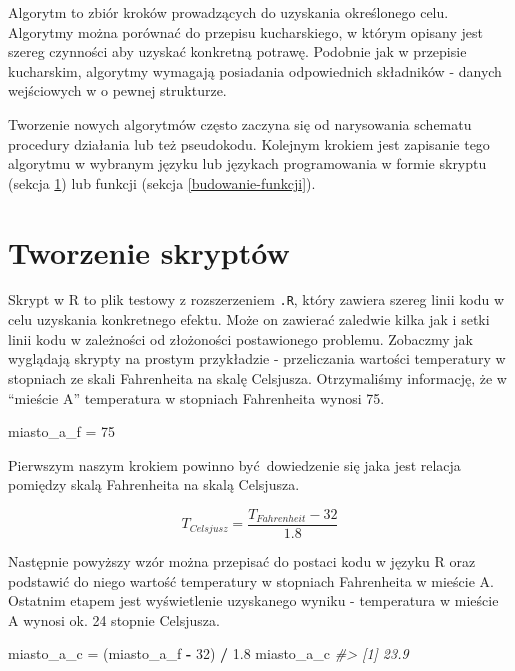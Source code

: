 \documentclass[paper=6in:9in,pagesize=pdftex,headinclude=on,footinclude=on,10pt]{scrbook}
\newenvironment{Shaded}{\begin{snugshade}}{\end{snugshade}}
\newcommand{\CommentTok}[1]{\textcolor[rgb]{0.56,0.35,0.01}{\textit{#1}}}
\newcommand{\DecValTok}[1]{\textcolor[rgb]{0.00,0.00,0.81}{#1}}
\newcommand{\FloatTok}[1]{\textcolor[rgb]{0.00,0.00,0.81}{#1}}
\newcommand{\NormalTok}[1]{#1}
\newcommand{\OperatorTok}[1]{\textcolor[rgb]{0.81,0.36,0.00}{\textbf{#1}}}
\newcommand{\StringTok}[1]{\textcolor[rgb]{0.31,0.60,0.02}{#1}}
\begin{document}
Algorytm to zbiór kroków prowadzących do uzyskania określonego celu.
Algorytmy można porównać do przepisu kucharskiego, w którym opisany jest szereg czynności aby uzyskać konkretną potrawę.
Podobnie jak w przepisie kucharskim, algorytmy wymagają posiadania odpowiednich składników - danych wejściowych w o pewnej strukturze.

Tworzenie nowych algorytmów często zaczyna się od narysowania schematu procedury działania lub też pseudokodu.
Kolejnym krokiem jest zapisanie tego algorytmu w wybranym języku lub językach programowania w formie skryptu (sekcja \ref{tworzenie-skryptow}) lub funkcji (sekcja \ref{budowanie-funkcji}).

\hypertarget{tworzenie-skryptow}{%
\section{Tworzenie skryptów}\label{tworzenie-skryptow}}

Skrypt w R to plik testowy z rozszerzeniem \texttt{.R}, który zawiera szereg linii kodu w celu uzyskania konkretnego efektu.
Może on zawierać zaledwie kilka jak i setki linii kodu w zależności od złożoności postawionego problemu.
Zobaczmy jak wyglądają skrypty na prostym przykładzie - przeliczania wartości temperatury w stopniach ze skali Fahrenheita na skalę Celsjusza.
Otrzymaliśmy informację, że w ``mieście A'' temperatura w stopniach Fahrenheita wynosi 75.

\begin{Shaded}
\begin{Highlighting}[]
\NormalTok{miasto_a_f =}\StringTok{ }\DecValTok{75}
\end{Highlighting}
\end{Shaded}

Pierwszym naszym krokiem powinno być~dowiedzenie się jaka jest relacja pomiędzy skalą Fahrenheita na skalą Celsjusza.

\[T_{Celsjusz} = \frac{T_{Fahrenheit} - 32}{1.8}\]

Następnie powyższy wzór można przepisać do postaci kodu w języku R oraz podstawić do niego wartość temperatury w stopniach Fahrenheita w mieście A.
Ostatnim etapem jest wyświetlenie uzyskanego wyniku - temperatura w mieście A wynosi ok. 24 stopnie Celsjusza.

\begin{Shaded}
\begin{Highlighting}[]
\NormalTok{miasto_a_c =}\StringTok{ }\NormalTok{(miasto_a_f }\OperatorTok{-}\StringTok{ }\DecValTok{32}\NormalTok{) }\OperatorTok{/}\StringTok{ }\FloatTok{1.8}
\NormalTok{miasto_a_c}
\CommentTok{#> [1] 23.9}
\end{Highlighting}
\end{Shaded}
\end{document}
